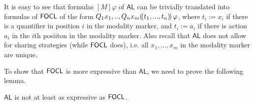 \documentclass[sigconf,anonymous]{aamas}
\begin{document}
It is easy to see that formulas $[M]\varphi$ of $\mathsf{AL}$ can be trivially translated into formulas of $\mathsf{FOCL}$ of the form $Q_1 x_1, .., Q_n x_m (\!( t_1, ..., t_n )\!)\, \varphi$, where $t_i := x_i$ if there is a quantifier in position $i$ in the modality marker, and $t_i:= a_i$ if there is action $a_i$ in the $i$th posiiton in the modality marker. Also recall that $\mathsf{AL}$ does not allow for sharing strategies (while $\mathsf{FOCL}$ does), i.e. all $x_1, ..., x_m$ in the modality marker are unique. 

To show that $\mathsf{FOCL}$ is more expressive than $\mathsf{AL}$, we need to prove the following lemma. %

\begin{lemma}
\label{lemma:exp}
    $\mathsf{AL}$ is not at least as expressive as $\mathsf{FOCL}$.
\end{lemma}
\end{document}
